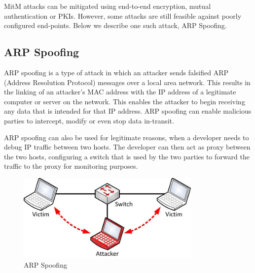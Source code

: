 MitM attacks can be mitigated using end-to-end encryption, mutual authentication
or PKIs. However, some attacks are still feasible against poorly configured
end-points. Below we describe one such attack, ARP Spoofing.


\subsection{ARP Spoofing}

ARP spoofing is a type of attack in which an attacker sends falsified ARP
(Address Resolution Protocol) messages over a local area network.
This results in the linking of an attacker’s MAC address with the IP address
of a legitimate computer or server on the network. This enables the attacker to
begin receiving any data that is intended for that IP address. ARP spoofing can 
enable malicious parties to intercept, modify or even stop data in-transit.

ARP spoofing can also be used for legitimate reasons, when a developer needs to
debug IP traffic between two hosts. The developer can then act as proxy between
the two hosts, configuring a switch that is used by the two parties to forward
the traffic to the proxy for monitoring purposes.

\begin{figure}[H] \caption{ARP Spoofing} \centering
\includegraphics[width=0.8\textwidth]{diagrams/arp_spoofing.jpg}\end{figure}


